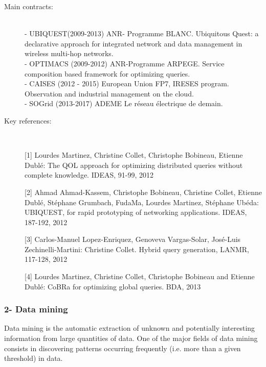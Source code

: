 \begin{description}
\item[Main contracts:] \ \\
- UBIQUEST(2009-2013) ANR- Programme BLANC. Ubiquitous Quest: a declarative approach for integrated network and data management in wireless multi-hop networks. \\
- OPTIMACS (2009-2012) ANR-Programme ARPEGE. Service composition based framework for optimizing queries.\\
- CAISES (2012 - 2015) European Union FP7, IRESES program. Observation and industrial management on the cloud.  \\
- SOGrid (2013-2017) ADEME Le r{\'e}seau {\'e}lectrique de demain. 

\item[Key references:]~%

[1] Lourdes Martinez, Christine Collet, Christophe Bobineau, Etienne Dubl{\'e}: The QOL approach for optimizing distributed queries without complete knowledge. IDEAS, 91-99, 2012

[2]  Ahmad Ahmad-Kassem, Christophe Bobineau, Christine Collet, Etienne Dubl{\'e}, St{\'e}phane Grumbach, FudaMa, Lourdes Martinez, St{\'e}phane Ub{\'e}da: UBIQUEST, for rapid prototyping of networking applications. IDEAS, 187-192, 2012

[3] Carlos-Manuel Lopez-Enriquez, Genoveva Vargas-Solar, Jos{\'e}-Luis Zechinelli-Martini:  Christine Collet. Hybrid query generation,  LANMR,  117-128, 2012

[4] Lourdes Martinez, Christine Collet, Christophe Bobineau and Etienne Dubl{\'e}: CoBRa for optimizing global queries. BDA, 2013

\end{description}

\subsubsection*{2- Data mining}

Data mining is the automatic extraction of unknown and potentially interesting information from large quantities of data. One of the major fields of data mining consists in discovering patterns occurring frequently (i.e. more than a given threshold) in data. 

